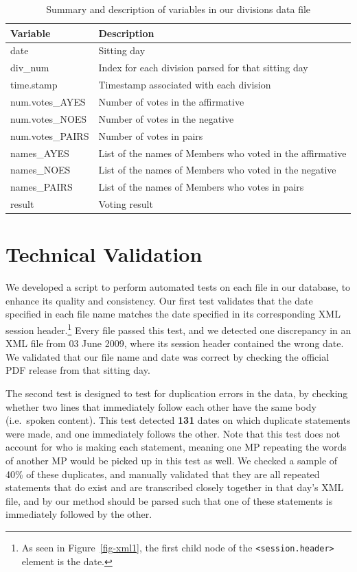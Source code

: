 \documentclass[
  letterpaper,
  DIV=11,
  numbers=noendperiod]{scrartcl}
\begin{document}
\hypertarget{tbl-divisions}{}
\begin{table}[H]
\caption{\label{tbl-divisions}Summary and description of variables in our divisions data file }\tabularnewline

\centering
\begin{tabular}{ll}
\toprule
Variable & Description\\
\midrule
date & Sitting day\\
div\_num & Index for each division parsed for that sitting day\\
time.stamp & Timestamp associated with each division\\
num.votes\_AYES & Number of votes in the affirmative\\
num.votes\_NOES & Number of votes in the negative\\
\addlinespace
num.votes\_PAIRS & Number of votes in pairs\\
names\_AYES & List of the names of Members who voted in the affirmative\\
names\_NOES & List of the names of Members who voted in the negative\\
names\_PAIRS & List of the names of Members who votes in pairs\\
result & Voting result\\
\bottomrule
\end{tabular}
\end{table}

\hypertarget{technical-validation}{%
\section{Technical Validation}\label{technical-validation}}

We developed a script to perform automated tests on each file in our
database, to enhance its quality and consistency. Our first test
validates that the date specified in each file name matches the date
specified in its corresponding XML session header.\footnote{As seen in
  Figure~\ref{fig-xml1}, the first child node of the
  \texttt{\textless{}session.header\textgreater{}} element is the date.}
Every file passed this test, and we detected one discrepancy in an XML
file from 03 June 2009, where its session header contained the wrong
date. We validated that our file name and date was correct by checking
the official PDF release from that sitting day.

The second test is designed to test for duplication errors in the data,
by checking whether two lines that immediately follow each other have
the same body (i.e.~spoken content). This test detected \textbf{131}
dates on which duplicate statements were made, and one immediately
follows the other. Note that this test does not account for who is
making each statement, meaning one MP repeating the words of another MP
would be picked up in this test as well. We checked a sample of 40\% of
these duplicates, and manually validated that they are all repeated
statements that do exist and are transcribed closely together in that
day's XML file, and by our method should be parsed such that one of
these statements is immediately followed by the other.
\end{document}
